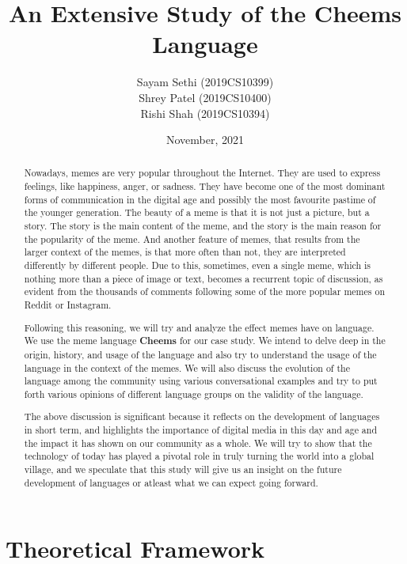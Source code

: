 \def\DevnagVersion{2.17}\documentclass{article}
\title{An Extensive Study of the Cheems Language}
\author{Sayam Sethi (2019CS10399)\\Shrey Patel (2019CS10400)\\Rishi Shah (2019CS10394)}
\date{November, 2021}
\begin{document}
\maketitle

\tableofcontents

\newpage

\begin{abstract}
    Nowadays, memes are very popular throughout the Internet. They are used to express feelings, like happiness, anger, or sadness. They have become one of the most dominant forms of communication in the digital age and possibly the most favourite pastime of the younger generation. The beauty of a meme is that it is not just a picture, but a story. The story is the main content of the meme, and the story is the main reason for the popularity of the meme. And another feature of memes, that results from the larger context of the memes,  is that more often than not, they are interpreted differently by different people. Due to this, sometimes, even a single meme, which is nothing more than a piece of image or text, becomes a recurrent topic of discussion, as evident from the thousands of comments following some of the more popular memes on Reddit or Instagram.

    Following this reasoning, we will try and analyze the effect memes have on language. We use the meme language \textbf{Cheems} for our case study. We intend to delve deep in the origin, history, and usage of the language and also try to understand the usage of the language in the context of the memes. We will also discuss the evolution of the language among the community using various conversational examples and try to put forth various opinions of different language groups on the validity of the language.

    The above discussion is significant because it reflects on the development of languages in short term, and highlights the importance of digital media in this day and age and the impact it has shown on our community as a whole. We will try to show that the technology of today has played a pivotal role in truly turning the world into a global village, and we speculate that this study will give us an insight on the future development of languages or atleast what we can expect going forward.
\end{abstract}

\section{Theoretical Framework}
\end{document}
